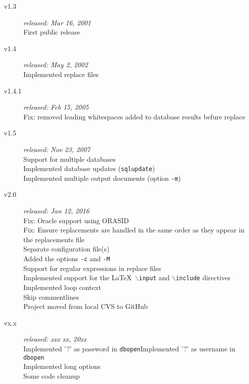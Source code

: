 \documentclass{article}
\newcommand{\bs}{\ensuremath{\backslash}}
\begin{document}
\begin{description}
\item[v1.3] \textit{released: Mar 16, 2001}\\First public release
\item[v1.4] \textit{released: May 2, 2002}\\Implemented replace files
\item[v1.4.1] \textit{released: Feb 15, 2005}\\Fix: removed leading whitespaces added to database results befure replace
\item[v1.5] \textit{released: Nov 23, 2007}\\Support for multiple databases\\Implemented database updates (\texttt{sqlupdate})\\Implemented multiple output documents (option \texttt{-m})
\item[v2.0] \textit{released: Jan 12, 2016}\\Fix: Oracle support using ORASID\\Fix: Ensure replacements are handled in the same order as they appear in the replacements file\\Separate configuration file(s)\\Added the options \texttt{-c} and \texttt{-M}\\Support for regular expressions in replace files\\Implemented support for the \LaTeX\ \texttt{\bs input} and \texttt{\bs include} directives\\Implemented loop context\\Skip commentlines\\Project moved from local CVS to GitHub
\item[vx.x] \textit{released: xxx xx, 20xx}\\Implemented '?' as password in \texttt{dbopen}Implemented '?' as username in \texttt{dbopen}\\Implemented long options\\Some code cleanup
\end{description}
\end{document}
